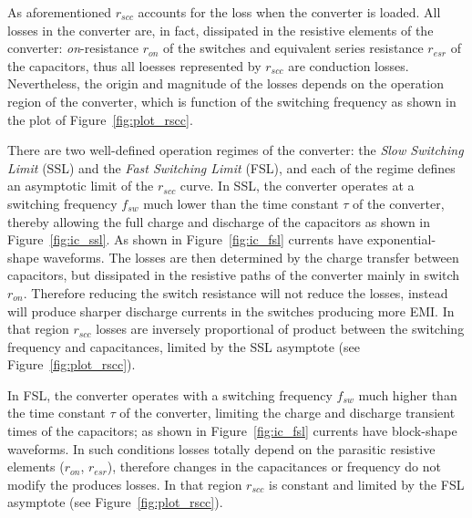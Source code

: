 As aforementioned $r_{scc}$ accounts for the loss when the converter is loaded. All losses in the converter are, in fact, dissipated in the resistive elements of the converter: \emph{on}-resistance $r_{on}$ of the switches and equivalent series resistance $r_{esr}$ of the capacitors, thus all loesses represented by $r_{scc}$ are conduction losses. Nevertheless, the origin and magnitude of the losses depends on the operation region of the converter, which is function of the switching frequency as shown in the plot of Figure~\ref{fig:plot_rscc}. 

There are two well-defined operation regimes of the converter: the \emph{Slow Switching Limit} (SSL) and the \emph{Fast Switching Limit} (FSL), and each of the regime defines an asymptotic limit of the $r_{scc}$ curve. In SSL, the converter operates at a switching frequency $f_{sw}$ much lower than the time constant $\tau$ of the converter, thereby allowing the full charge and discharge of the capacitors as shown in Figure~\ref{fig:ic_ssl}. As shown in Figure~\ref{fig:ic_fsl} currents have exponential-shape waveforms. The losses are then determined by the charge transfer between capacitors, but dissipated in the resistive paths of the converter mainly in switch $r_{on}$. Therefore reducing the switch resistance will not reduce the losses, instead will produce sharper discharge currents in the switches producing more EMI. In that region $r_{scc}$ losses are inversely proportional of product between the switching frequency and capacitances, limited by the SSL asymptote (see Figure~\ref{fig:plot_rscc}).

In FSL, the converter operates with a switching frequency $f_{sw}$ much higher than the time constant $\tau$ of the converter, limiting the charge and discharge transient times of the capacitors; as shown in Figure~\ref{fig:ic_fsl} currents have block-shape waveforms. In such conditions losses totally depend on the parasitic resistive elements ($r_{on}$, $r_{esr}$), therefore changes in the capacitances or frequency do not modify the produces losses. In that region $r_{scc}$ is constant and limited by the FSL asymptote (see Figure~\ref{fig:plot_rscc}).

